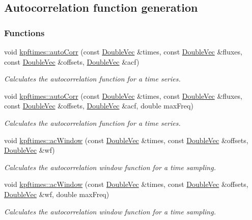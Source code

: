 \hypertarget{group__acf}{
\subsection{Autocorrelation function generation}
\label{group__acf}
}
\subsubsection*{Functions}
\begin{DoxyCompactItemize}
\item 
void \hyperlink{group__acf_gabbd381218252378ba3c999f49b10f522}{kpftimes::autoCorr} (const \hyperlink{dft_8h_ae5d5553d1db3abe03c161a5ffd0bf9ad}{DoubleVec} \&times, const \hyperlink{dft_8h_ae5d5553d1db3abe03c161a5ffd0bf9ad}{DoubleVec} \&fluxes, const \hyperlink{dft_8h_ae5d5553d1db3abe03c161a5ffd0bf9ad}{DoubleVec} \&offsets, \hyperlink{dft_8h_ae5d5553d1db3abe03c161a5ffd0bf9ad}{DoubleVec} \&acf)
\begin{DoxyCompactList}\small\item\em Calculates the autocorrelation function for a time series. \end{DoxyCompactList}\item 
void \hyperlink{group__acf_gae1a0defc2c251ed147a33877081ba7d7}{kpftimes::autoCorr} (const \hyperlink{dft_8h_ae5d5553d1db3abe03c161a5ffd0bf9ad}{DoubleVec} \&times, const \hyperlink{dft_8h_ae5d5553d1db3abe03c161a5ffd0bf9ad}{DoubleVec} \&fluxes, const \hyperlink{dft_8h_ae5d5553d1db3abe03c161a5ffd0bf9ad}{DoubleVec} \&offsets, \hyperlink{dft_8h_ae5d5553d1db3abe03c161a5ffd0bf9ad}{DoubleVec} \&acf, double maxFreq)
\begin{DoxyCompactList}\small\item\em Calculates the autocorrelation function for a time series. \end{DoxyCompactList}\item 
void \hyperlink{group__acf_ga3abd7e8a3ae34d649c1fb03512ad93f2}{kpftimes::acWindow} (const \hyperlink{dft_8h_ae5d5553d1db3abe03c161a5ffd0bf9ad}{DoubleVec} \&times, const \hyperlink{dft_8h_ae5d5553d1db3abe03c161a5ffd0bf9ad}{DoubleVec} \&offsets, \hyperlink{dft_8h_ae5d5553d1db3abe03c161a5ffd0bf9ad}{DoubleVec} \&wf)
\begin{DoxyCompactList}\small\item\em Calculates the autocorrelation window function for a time sampling. \end{DoxyCompactList}\item 
void \hyperlink{group__acf_ga4eb6462c49b267c2f9e43d873efc91a5}{kpftimes::acWindow} (const \hyperlink{dft_8h_ae5d5553d1db3abe03c161a5ffd0bf9ad}{DoubleVec} \&times, const \hyperlink{dft_8h_ae5d5553d1db3abe03c161a5ffd0bf9ad}{DoubleVec} \&offsets, \hyperlink{dft_8h_ae5d5553d1db3abe03c161a5ffd0bf9ad}{DoubleVec} \&wf, double maxFreq)
\begin{DoxyCompactList}\small\item\em Calculates the autocorrelation window function for a time sampling. \end{DoxyCompactList}\end{DoxyCompactItemize}


